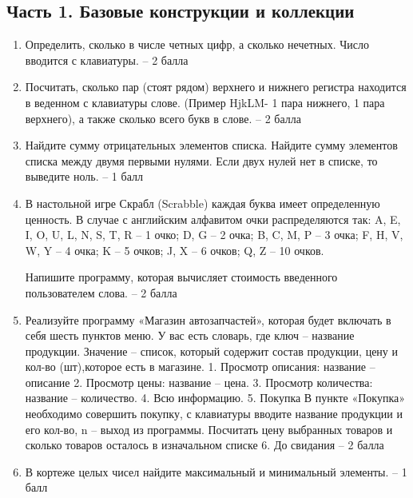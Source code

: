 \documentclass[14pt,a4paper]{extarticle}
\begin{document}
\subsection{Часть 1. Базовые конструкции и коллекции}
\begin{enumerate}[label=\arabic*.]
  \item Определить, сколько в числе четных цифр, а сколько нечетных. Число вводится с клавиатуры. – 2 балла
  \item Посчитать, сколько пар (стоят рядом) верхнего и нижнего регистра находится в веденном с клавиатуры слове. (Пример HjkLM- 1 пара нижнего, 1 пара верхнего), а также сколько всего букв в слове. – 2 балла
  \item Найдите сумму отрицательных элементов списка. Найдите сумму элементов списка между двумя первыми нулями. Если двух нулей нет в списке, то выведите ноль. – 1 балл
  \item В настольной игре Скрабл (Scrabble) каждая буква имеет определенную ценность. В случае с английским алфавитом очки распределяются так: A, E, I, O, U, L, N, S, T, R – 1 очко; D, G – 2 очка; B, C, M, P – 3 очка; F, H, V, W, Y – 4 очка; K – 5 очков; J, X – 6 очков; Q, Z – 10 очков.

  Напишите программу, которая вычисляет стоимость введенного пользователем слова. – 2 балла
  \item Реализуйте программу «Магазин автозапчастей», которая будет включать в себя шесть пунктов меню. У вас есть словарь, где ключ – название продукции. Значение – список, который содержит состав продукции, цену и кол-во (шт),которое есть в магазине. 1. Просмотр описания: название – описание 2. Просмотр цены: название – цена. 3. Просмотр количества: название – количество. 4. Всю информацию. 5. Покупка В пункте «Покупка» необходимо совершить покупку, с клавиатуры вводите название продукции и его кол-во, n – выход из программы. Посчитать цену выбранных товаров и сколько товаров осталось в изначальном списке 6. До свидания – 2 балла
  \item В кортеже целых чисел найдите максимальный и минимальный элементы. – 1 балл
\end{enumerate}
\end{document}
